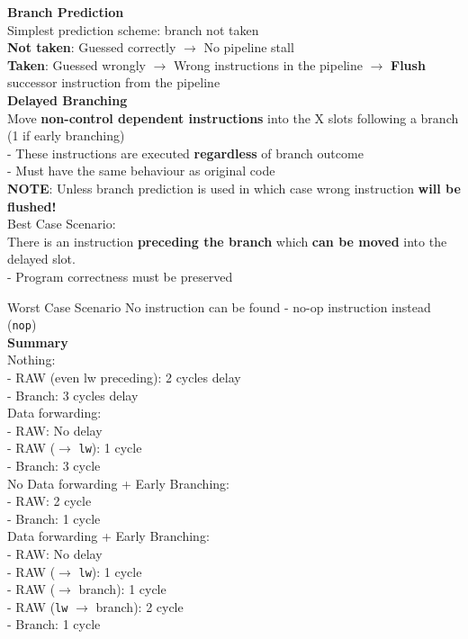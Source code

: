 \documentclass[10pt, a4paper]{article}
\newcommand{\highlight}[1]{{\color{red}\textbf{#1}}}
\begin{document}
\begin{multicols*}{3}
		\textbf{Branch Prediction}\\
		Simplest prediction scheme: branch not taken\\
		\highlight{Not taken}: Guessed correctly $\rightarrow$ No pipeline stall\\
		\highlight{Taken}: Guessed wrongly $\rightarrow$ Wrong instructions in the pipeline $\rightarrow$ \textbf{Flush} successor instruction from the pipeline\\
		
		\textbf{Delayed Branching}\\
		Move \textbf{non-control dependent instructions} into the X slots following a branch (1 if early branching)\\
		- These instructions are executed \textbf{regardless} of branch outcome\\
		- Must have the same behaviour as original code\\
		\highlight{NOTE}: Unless branch prediction is used in which case wrong instruction \textbf{will be flushed!}\\
		
		Best Case Scenario:\\
		There is an instruction \textbf{preceding the branch} which \textbf{can be moved} into the delayed slot.\\
		- Program correctness must be preserved
		
		Worst Case Scenario
		No instruction can be found
		- no-op instruction instead (\texttt{nop})\\

		\highlight{Summary}\\
		Nothing:\\
		- RAW (even lw preceding): 2 cycles delay\\
		- Branch: 3 cycles delay\\

		Data forwarding:\\
		- RAW: No delay\\
		- RAW ($\rightarrow$ \texttt{lw}): 1 cycle \\
		- Branch: 3 cycle \\

		No Data forwarding + Early Branching:\\
		- RAW: 2 cycle \\
		- Branch: 1 cycle \\

		Data forwarding + Early Branching:\\
		- RAW: No delay\\
		- RAW ($\rightarrow$ \texttt{lw}): 1 cycle \\
		- RAW ($\rightarrow$ branch): 1 cycle \\
		- RAW (\texttt{lw} $\rightarrow$ branch): 2 cycle \\
		- Branch: 1 cycle\\


\end{multicols*}
\end{document}
